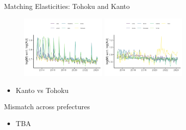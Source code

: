 \documentclass[aspectratio=169]{beamer}
\begin{document}
\begin{frame}{Matching Elasticities: Tohoku and Kanto}
\begin{figure}[!ht]
  \begin{center}
  \includegraphics[width = 0.37\textwidth]
  {figuretable/elasticity_unemployed_month_aggregate_tohoku.png}
  \includegraphics[width = 0.37\textwidth]
  {figuretable/elasticity_unemployed_month_aggregate_kanto.png}
  \end{center}
  \footnotesize
\end{figure} 
\begin{itemize}
    \item Kanto vs Tohoku
\end{itemize}
\end{frame}

\begin{frame}{Mismatch across prefectures}
\begin{itemize}
    \item TBA
\end{itemize}
\end{frame}
\end{document}
